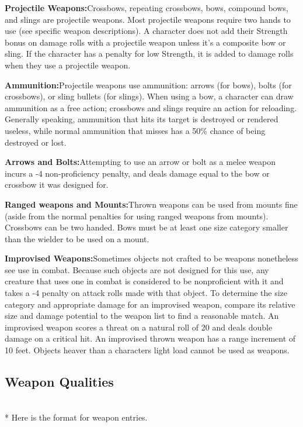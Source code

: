 {\noindent\textbf{Projectile Weapons:}{Crossbows, repeating crossbows, bows, compound bows, and slings are projectile weapons. Most projectile weapons require two hands to use (see specific weapon descriptions). A character does not add their Strength bonus on damage rolls with a projectile weapon unless it’s a composite bow or sling. If the character has a penalty for low Strength, it is added to damage rolls when they use a projectile weapon.}

\noindent\textbf{Ammunition:}{Projectile weapons use ammunition: arrows (for bows), bolts (for crossbows), or sling bullets (for slings). When using a bow, a character can draw ammunition as a free action; crossbows and slings require an action for reloading. Generally speaking, ammunition that hits its target is destroyed or rendered useless, while normal ammunition that misses has a 50\% chance of being destroyed or lost.}

\noindent\textbf{Arrows and Bolts:}{Attempting to use an arrow or bolt as a melee weapon incurs a -4 non-proficiency penalty, and deals damage equal to the bow or crossbow it was designed for.}

\noindent\textbf{Ranged weapons and Mounts:}{Thrown weapons can be used from mounts fine (aside from the normal penalties for using ranged weapons from mounts). Crossbows can be two handed. Bows must be at least one size category smaller than the wielder to be used on a mount.}

\noindent\textbf{Improvised Weapons:}{Sometimes objects not crafted to be weapons nonetheless see use in combat. Because such objects are not designed for this use, any creature that uses one in combat is considered to be nonproficient with it and takes a -4 penalty on attack rolls made with that object. To determine the size category and appropriate damage for an improvised weapon, compare its relative size and damage potential to the weapon list to find a reasonable match. An improvised weapon scores a threat on a natural roll of 20 and deals double damage on a critical hit. An improvised thrown weapon has a range increment of 10 feet. Objects heaver than a characters light load cannot be used as weapons.}

\subsection{Weapon Qualities}
~\\*
Here is the format for weapon entries. \\

}
